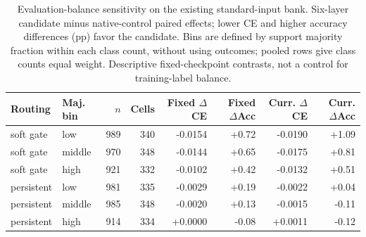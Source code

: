 \begin{table}[t]
\centering\footnotesize
\caption{Evaluation-balance sensitivity on the existing standard-input bank. Six-layer candidate minus native-control paired effects; lower CE and higher accuracy differences (pp) favor the candidate. Bins are defined by support majority fraction within each class count, without using outcomes; pooled rows give class counts equal weight. Descriptive fixed-checkpoint contrasts, not a control for training-label balance.}\label{tab:balance}
\begin{tabular}{@{}llrrrrrr@{}}\toprule
Routing & Maj. bin & $n$ & Cells & Fixed $\Delta$CE & Fixed $\Delta$Acc & Curr. $\Delta$CE & Curr. $\Delta$Acc\\\midrule
soft gate & low & 989 & 340 & -0.0154 & +0.72 & -0.0190 & +1.09\\
soft gate & middle & 970 & 348 & -0.0144 & +0.65 & -0.0175 & +0.81\\
soft gate & high & 921 & 332 & -0.0102 & +0.42 & -0.0132 & +0.51\\
persistent & low & 981 & 335 & -0.0029 & +0.19 & -0.0022 & +0.04\\
persistent & middle & 985 & 348 & -0.0020 & +0.13 & -0.0015 & -0.11\\
persistent & high & 914 & 334 & +0.0000 & -0.08 & +0.0011 & -0.12\\
\bottomrule\end{tabular}
\end{table}

